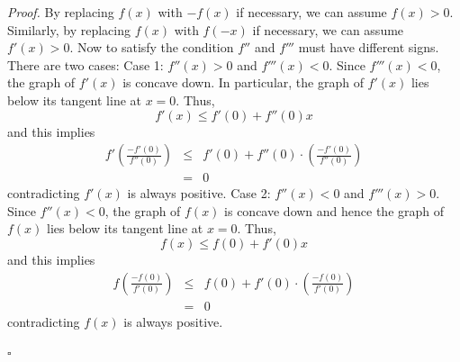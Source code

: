 \documentclass[11pt,letterpaper]{article}
\begin{document}
\vspace{.5pc} 
\textit{Proof.  }By replacing $f(x)$ with $-f(x)$ if necessary, we can assume $f(x)>0$.  Similarly, by replacing $f(x)$ with $f(-x)$ if
necessary, we can assume $f'(x)> 0$.  Now to satisfy the condition $f''$ and $f'''$ must have different signs.  There are two cases:
\linebreak
Case 1: $f''(x)>0$ and $f'''(x)<0$.
\linebreak 
Since $f'''(x)< 0$, the graph of $f'(x)$ is concave down.  In particular, the graph of $f'(x)$ lies below its tangent line at $x=0$. Thus,
\[f'(x)\leq f'(0)+f''(0)x\]
and this implies
\begin{eqnarray*}
 f'\left(\frac{-f'(0)}{f''(0)}\right) &\leq & f'(0)+f''(0)\cdot \left(\frac{-f'(0)}{f''(0)}\right) \\
&=& 0
\end{eqnarray*}
contradicting $f'(x)$ is always positive.
\linebreak
Case 2: $f''(x)<0$ and $f'''(x)>0$.
\linebreak
Since $f''(x)<0$, the graph of $f(x)$ is concave down and hence the graph of
$f(x)$ lies below its tangent line at $x = 0$. Thus,
\[f(x)\leq f(0)+f'(0)x\]
and this implies
\begin{eqnarray*}
 f\left(\frac{-f(0)}{f'(0)}\right) &\leq & f(0)+f'(0)\cdot \left(\frac{-f(0)}{f'(0)}\right) \\
&=& 0
\end{eqnarray*}
contradicting $f(x)$ is always positive.

\begin{flushright}$\square $\end{flushright}
\end{document}
